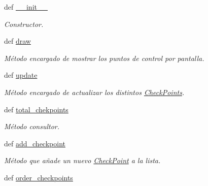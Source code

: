 \begin{DoxyCompactItemize}
\item 
def \hyperlink{classengine_1_1checkpoint_1_1CheckPoints_a65282b0a646eb575e2f42e5e77531596}{\-\_\-\-\_\-init\-\_\-\-\_\-}
\begin{DoxyCompactList}\small\item\em \-Constructor. \end{DoxyCompactList}\item 
def \hyperlink{classengine_1_1checkpoint_1_1CheckPoints_a47f04aaf7526ff3ad2851e17d26e305c}{draw}
\begin{DoxyCompactList}\small\item\em \-Método encargado de mostrar los puntos de control por pantalla. \end{DoxyCompactList}\item 
def \hyperlink{classengine_1_1checkpoint_1_1CheckPoints_a10c8fe3cbc889ef61f5e81e8290b152a}{update}
\begin{DoxyCompactList}\small\item\em \-Método encargado de actualizar los distintos \hyperlink{classengine_1_1checkpoint_1_1CheckPoints}{\-Check\-Points}. \end{DoxyCompactList}\item 
def \hyperlink{classengine_1_1checkpoint_1_1CheckPoints_ac9ce4f5705de938f494f6b895c062c19}{total\-\_\-chekpoints}
\begin{DoxyCompactList}\small\item\em \-Método consultor. \end{DoxyCompactList}\item 
def \hyperlink{classengine_1_1checkpoint_1_1CheckPoints_ae8e6aecbbfc4c8cca95efc6d1648034c}{add\-\_\-checkpoint}
\begin{DoxyCompactList}\small\item\em \-Método que añade un nuevo \hyperlink{classengine_1_1checkpoint_1_1CheckPoint}{\-Check\-Point} a la lista. \end{DoxyCompactList}\item 
\hypertarget{classengine_1_1checkpoint_1_1CheckPoints_ac83ccadfec0a7645a079dfb5b9fbb2e5}{
def \hyperlink{classengine_1_1checkpoint_1_1CheckPoints_ac83ccadfec0a7645a079dfb5b9fbb2e5}{order\-\_\-checkpoints}}
\label{classengine_1_1checkpoint_1_1CheckPoints_ac83ccadfec0a7645a079dfb5b9fbb2e5}


\end{DoxyCompactItemize}
